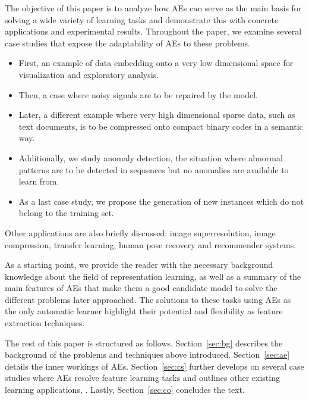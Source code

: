 The objective of this paper is to analyze how AEs can serve as the main basis for solving a wide variety of learning tasks and demonstrate this with concrete applications and experimental results. 
Throughout the paper, we examine several case studies that expose the adaptability of AEs to these problems.\begin{itemize}
    \item First, an example of data embedding onto a very low dimensional space for visualization and exploratory analysis. 
    \item Then, a case where noisy signals are to be repaired by the model.
    \item Later, a different example where very high dimensional sparse data, such as text documents, is to be compressed onto compact binary codes in a semantic way.
    \item Additionally, we study anomaly detection, the situation where abnormal patterns are to be detected in sequences but no anomalies are available to learn from.
    \item As a last case study, we propose the generation of new instances which do not belong to the training set. 
\end{itemize}    

Other applications are also briefly discussed: image superresolution, image compression, transfer learning, human pose recovery and recommender systems. 

As a starting point, we provide the reader with the necessary background knowledge about the field of representation learning, as well as a summary of the main features of AEs that make them a good candidate model to solve the different problems later approached. The solutions to these tasks using AEs as the only automatic learner highlight their potential and flexibility as feature extraction techniques. 


The rest of this paper is structured as follows. Section~\ref{sec:bg} describes the background of the problems and techniques above introduced. Section~\ref{sec:ae} details the inner workings of AEs. Section~\ref{sec:cs} further develops on several case studies where AEs resolve feature learning tasks and outlines other existing learning applications, . Lastly, Section~\ref{sec:co} concludes the text.

